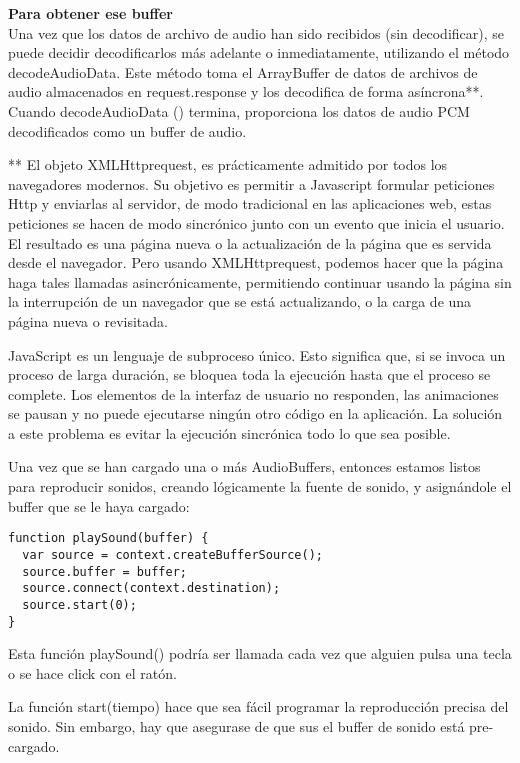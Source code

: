 \noindent\textbf{Para obtener ese buffer}\\
Una vez que los datos de archivo de audio han sido recibidos (sin decodificar), se puede decidir decodificarlos más adelante o inmediatamente, utilizando el método decodeAudioData. Este método toma el ArrayBuffer de datos de archivos de audio almacenados en request.response y los decodifica de forma asíncrona**. 
Cuando decodeAudioData () termina, proporciona los datos de audio PCM decodificados  como un buffer de audio.

** 
El objeto XMLHttprequest, es prácticamente admitido por todos los navegadores modernos. Su objetivo es permitir a Javascript formular peticiones Http y enviarlas al servidor, de modo tradicional en las aplicaciones web, estas peticiones se hacen de modo sincrónico junto con un evento que inicia el usuario. El resultado es una página nueva o la actualización de la página que es servida desde el navegador. Pero usando XMLHttprequest, podemos hacer que la página haga tales llamadas asincrónicamente, permitiendo continuar usando la página sin la interrupción de un navegador que se está actualizando, o la carga de una página nueva o revisitada.

JavaScript es un lenguaje de subproceso único. Esto significa que, si se invoca un proceso de larga duración, se bloquea toda la ejecución hasta que el proceso se complete. Los elementos de la interfaz de usuario no responden, las animaciones se pausan y no puede ejecutarse ningún otro código en la aplicación. La solución a este problema es evitar la ejecución sincrónica todo lo que sea posible.

Una vez que se han cargado una o más AudioBuffers, entonces estamos listos para reproducir sonidos,  creando lógicamente la fuente de sonido, y asignándole el buffer que se le haya cargado:
\begin{verbatim}
function playSound(buffer) {
  var source = context.createBufferSource(); 
  source.buffer = buffer;                    
  source.connect(context.destination);       
  source.start(0);                           
}
\end{verbatim}

Esta función playSound() podría ser llamada cada vez que alguien pulsa una tecla o se hace click con el ratón. 

La función start(tiempo) hace que sea fácil programar la reproducción precisa del sonido. Sin embargo, hay que asegurase de que sus el buffer de sonido está pre-cargado.


